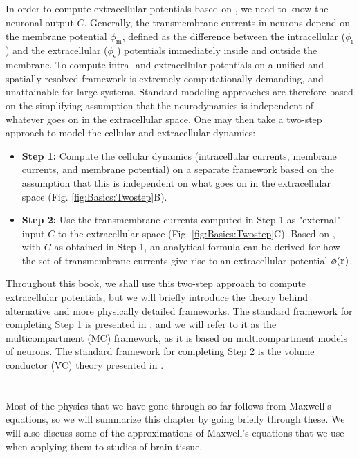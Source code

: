 \subsection{}
\label{sec:Basics:twostep}
In order to compute extracellular potentials based on , we need to know the neuronal output $C$. Generally, the transmembrane currents in neurons depend on the membrane potential $\phi_\text{m}$, defined as the difference between the intracellular ($\phi_\text{i}$) and the extracellular ($\phi_\text{e}$) potentials immediately inside and outside the membrane. To compute intra- and extracellular potentials on a unified and spatially resolved framework is extremely computationally demanding, and unattainable for large systems. Standard modeling approaches are therefore based on the simplifying assumption that the neurodynamics is independent of whatever goes on in the extracellular space. One may then take a two-step approach to model the cellular and extracellular dynamics: 

\begin{itemize}
\item {\bf Step 1:} Compute the cellular dynamics (intracellular currents, membrane currents, and membrane potential) on a separate framework based on the assumption that this is independent on what goes on in the extracellular space (Fig. \ref{fig:Basics:Twostep}B). 

\item {\bf Step 2:} Use the transmembrane currents computed in Step 1 as "external" input $C$ to the extracellular space (Fig. \ref{fig:Basics:Twostep}C). Based on , with $C$ as obtained in Step 1, an analytical formula can be derived for how the set of transmembrane currents give rise to an extracellular potential $\phi({\bf r})$. 
\end{itemize}

Throughout this book, we shall use this two-step approach to compute extracellular potentials, but we will briefly introduce the theory behind alternative and more physically detailed frameworks. The standard framework for completing Step 1 is presented in , and we will refer to it as the multicompartment (MC) framework, as it is based on multicompartment models of neurons. The standard framework for completing Step 2 is the volume conductor (VC) theory presented in  . 


\section{}
\label{sec:Basics:Maxwell} 
Most of the physics that we have gone through so far follows from Maxwell's equations, so we will summarize this chapter by going briefly through these. We will also discuss some of the approximations of Maxwell's equations that we use when applying them to studies of brain tissue. 

